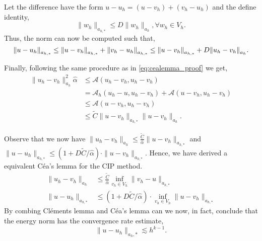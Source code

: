 Let the difference have the form $u - u_{h} = (u - v_{h} )  + (v_{h} - u_{h})$ and the define identity,
$$
\| w_{h} \|_{ a_{h,*} }^{  }  \le  D \| w_{h} \|_{ a_{h} }^{  }, \forall w_{h} \in V_{h} .
$$
Thus, the norm can now be computed such that,\[
\| u - u_{h} \|_{ a_{h,*} }^{  } \le \|u - v_{h}  \|_{a_{h,*}  }^{  }  + \| v_{h} - u_{h} \|_{a_{h,*}  }^{  } \\
\le \| u -v_{h} \|_{ a_{h,*} }^{  }  + D \| u_{h} - v_{h} \|_{a_{h}  }^{  }.
\]

Finally, following the same procedure as in \eqref{eq:cealemma_proof} we get,
\[
    \begin{split}
\| u_{h} - v_{h} \|_{a_{h}  }^{2  } \hat{\alpha } & \le  \mathcal{A} \left( u_{h} - v_{h}, u_{h} - v_{h} \right) \\
& =  \mathcal{A} _{h} \left( u_{h} -u, u_{h} -v_{h} \right) + \mathcal{A} \left( u - v_{h}, u_{h} - v_{h} \right) \\
 &  \le  \mathcal{A}  \left( u - v_{h}, u_{h} - v_{h} \right)   \\
 &\le  \widetilde{C} \| u - v_{h} \|_{ a_{h,*} }^{  } \| u- v_{h} \|_{ a_{h} }^{  }.
    \end{split}
\]

Observe that we now have $ \| u_{h} - v_{h} \|_{ a_{h} }^{  }   \le \frac{\widetilde{C}}{\hat{\alpha }}  \| u - v_{h} \|_{ a_{h, *} }^{  }$ and $\| u - u_{h} \|_{ a_{h,*} }^{  }   \le \left( 1 + D \widetilde{C} /\hat{\alpha } \right)\cdot  \| u -
v_{h} \|_{ a_{h,*} }^{  } $. Hence, we have derived a equivalent Céa's lemma for the CIP method.
\[
    \begin{split}
\| u_{h} - v_{h} \|_{ a_{h} }^{  }  & \le \frac{\widetilde{C}}{\hat{\alpha }}  \inf_{v_{h} \in  V_{h}} \|  v_{h} - u \|_{ a_{h, *} }^{  } \\
\| u - u_{h} \|_{ a_{h,*} }^{  }  & \le \left( 1 + D \widetilde{C} /\hat{\alpha } \right)\cdot \inf_{v_{h} \in  V_{h}}   \| u - v_{h} \|_{ a_{h,*} }^{  }
    \end{split}
\]
By combing Cléments lemma and Céa's lemma can we now, in fact, conclude that the energy norm has the convergence rate estimate,
\begin{equation}
\label{eq:conv_estimate}
\| u - u_{h} \|_{ a_{h}, * }^{  } \lesssim h^{k-1}.
\end{equation}
















